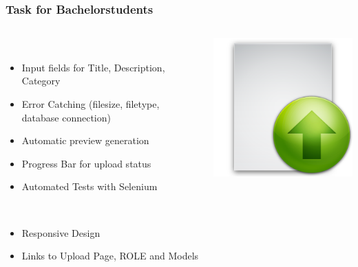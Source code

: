 \begin{frame}
  \frametitle{Task for Bachelorstudents}
  \begin{columns}
  	\begin{column}{0.8\textwidth}
  \begin{description}[]
    \item[Upload Page] \hfill \\
        \begin{itemize}
          \item Input fields for Title, Description, Category
          \item Error Catching (filesize, filetype, database connection)
	 \item Automatic preview generation
	 \item Progress Bar for upload status
	\item Automated Tests with Selenium
        \end{itemize}
    \item[Welcome Page] \hfill \\
      \begin{itemize}
        \item Responsive Design
        \item Links to Upload Page, ROLE and Models
      \end{itemize}
  \end{description} 
    \end{column}
    \begin{column}{0.2\textwidth}
   	  \includegraphics[width=\textwidth]{images/upload}
    \end{column}
  \end{columns}
\end{frame}


